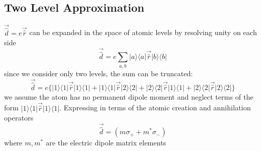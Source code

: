 \subsection{Two Level Approximation}
$\vec{\hat{d}} = e \vec{\hat{r}}$ can be expanded in the space of atomic levels by resolving unity on each side
\begin{equation}
	\vec{\hat{d}} = e \sum_{a, b} | a \rangle \langle a | \vec{\hat{r} }| b \rangle \langle b |
\end{equation}
since we consider only two levels, the sum can be truncated:
\begin{equation}
	\vec{\hat{d}} = e\{| 1 \rangle \langle 1|\vec{\hat{r}} | 1 \rangle \langle 1 | + | 1 \rangle \langle 1|\vec{\hat{r}} | 2 \rangle \langle 2 | + | 2 \rangle \langle 2|\vec{\hat{r}} | 1 \rangle \langle 1 | + | 2 \rangle \langle 2|\vec{\hat{r}} | 2 \rangle \langle 2 | \}
\end{equation}
we assume the atom has no permanent dipole moment and neglect terms of the form $| 1 \rangle \langle 1|\vec{\hat{r}} | 1 \rangle \langle 1 |$.
Expressing in terms of the atomic creation and annihilation operators
\begin{equation}
	\vec{\hat{d}} = (m\sigma_+ + m^* \sigma_-)
\end{equation}
where $m, m^*$ are the electric dipole matrix elements

